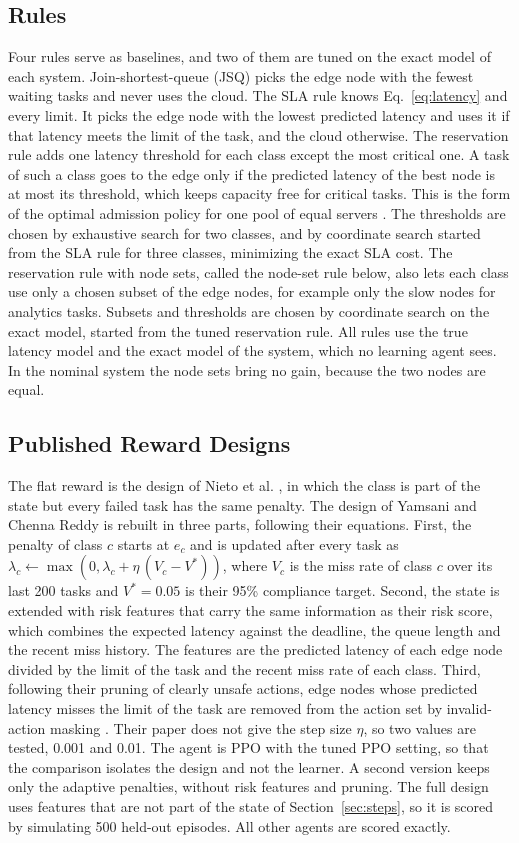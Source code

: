 \documentclass[journal]{IEEEtran}
\begin{document}
\subsection{Rules}
Four rules serve as baselines, and two of them are tuned on the exact model of each system. Join-shortest-queue (JSQ) picks the edge node with the fewest waiting tasks and never uses the cloud. The SLA rule knows Eq.~\eqref{eq:latency} and every limit. It picks the edge node with the lowest predicted latency and uses it if that latency meets the limit of the task, and the cloud otherwise. The reservation rule adds one latency threshold for each class except the most critical one. A task of such a class goes to the edge only if the predicted latency of the best node is at most its threshold, which keeps capacity free for critical tasks. This is the form of the optimal admission policy for one pool of equal servers \cite{miller1969}. The thresholds are chosen by exhaustive search for two classes, and by coordinate search started from the SLA rule for three classes, minimizing the exact SLA cost. The reservation rule with node sets, called the node-set rule below, also lets each class use only a chosen subset of the edge nodes, for example only the slow nodes for analytics tasks. Subsets and thresholds are chosen by coordinate search on the exact model, started from the tuned reservation rule. All rules use the true latency model and the exact model of the system, which no learning agent sees. In the nominal system the node sets bring no gain, because the two nodes are equal.

\subsection{Published Reward Designs}
The flat reward is the design of Nieto et al. \cite{nieto2024}, in which the class is part of the state but every failed task has the same penalty. The design of Yamsani and Chenna Reddy \cite{yamsani2026} is rebuilt in three parts, following their equations. First, the penalty of class $c$ starts at $e_c$ and is updated after every task as $\lambda_c \leftarrow \max(0, \lambda_c + \eta\,(V_c - V^\ast))$, where $V_c$ is the miss rate of class $c$ over its last 200 tasks and $V^\ast = 0.05$ is their 95\% compliance target. Second, the state is extended with risk features that carry the same information as their risk score, which combines the expected latency against the deadline, the queue length and the recent miss history. The features are the predicted latency of each edge node divided by the limit of the task and the recent miss rate of each class. Third, following their pruning of clearly unsafe actions, edge nodes whose predicted latency misses the limit of the task are removed from the action set by invalid-action masking \cite{huang2022}. Their paper does not give the step size $\eta$, so two values are tested, 0.001 and 0.01. The agent is PPO with the tuned PPO setting, so that the comparison isolates the design and not the learner. A second version keeps only the adaptive penalties, without risk features and pruning. The full design uses features that are not part of the state of Section~\ref{sec:steps}, so it is scored by simulating 500 held-out episodes. All other agents are scored exactly.
\end{document}
